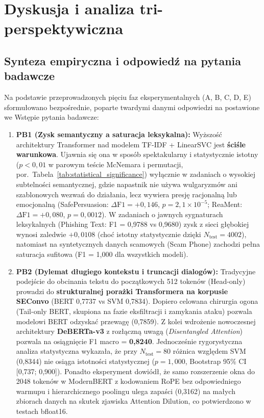 \documentclass[12pt,a4paper,twoside]{report}
\begin{document}
\chapter{Dyskusja i analiza tri-perspektywiczna}\label{ch:discussion}

\section{Synteza empiryczna i odpowiedź na pytania badawcze}
Na podstawie przeprowadzonych pięciu faz eksperymentalnych (A, B, C, D, E) sformułowano bezpośrednie, poparte twardymi danymi odpowiedzi na postawione we Wstępie pytania badawcze:

\begin{enumerate}[leftmargin=1.5em]
  \item \textbf{PB1 (Zysk semantyczny a saturacja leksykalna):} Wyższość architektury Transformer nad modelem TF-IDF + LinearSVC jest \textbf{ściśle warunkowa}. Ujawnia się ona w sposób spektakularny i statystycznie istotny ($p < 0,01$ w parowym teście McNemara i permutacji, por.~Tabela~\ref{tab:statistical_significance}) wyłącznie w zadaniach o wysokiej subtelności semantycznej, gdzie napastnik nie używa wulgaryzmów ani szablonowych wezwań do działania, lecz wywiera presję racjonalną lub emocjonalną (SafePersuasion: $\Delta\text{F1} = +0,146$, $p = 2,1 \times 10^{-5}$; ReaMent: $\Delta\text{F1} = +0,080$, $p = 0,0012$). W zadaniach o jawnych sygnaturach leksykalnych (Phishing Text: F1 = 0,9788 vs 0,9680) zysk z sieci głębokiej wynosi zaledwie $+0,0108$ (choć istotny statystycznie dzięki $N_{\text{test}}=4002$), natomiast na syntetycznych danych scamowych (Scam Phone) zachodzi pełna saturacja sufitowa (F1 = 1,000 dla wszystkich modeli).
  
  \item \textbf{PB2 (Dylemat długiego kontekstu i truncacji dialogów):} Tradycyjne podejście do obcinania tekstu do początkowych 512 tokenów (Head-only) prowadzi do \textbf{strukturalnej porażki Transformera na korpusie SEConvo} (BERT 0,7737 vs SVM 0,7834). Dopiero celowana chirurgia ogona (Tail-only BERT, skupiona na fazie eksfiltracji i zamykania ataku) pozwala modelowi BERT odzyskać przewagę (0,7859). Z kolei wdrożenie nowoczesnej architektury \textbf{DeBERTa-v3} z rozłączną uwagą (\emph{Disentangled Attention}) pozwala na osiągnięcie F1 macro = \textbf{0,8240}. Jednocześnie rygorystyczna analiza statystyczna wykazała, że przy $N_{\text{test}}=80$ różnica względem SVM (0,8344) nie osiąga istotności statystycznej ($p = 1,000$, Bootstrap 95\% CI [0,737; 0,900]). Ponadto eksperyment dowiódł, że samo rozszerzenie okna do 2048 tokenów w ModernBERT z kodowaniem RoPE bez odpowiedniego warmupu i hierarchicznego poolingu ulega zapaści (0,3162) na małych zbiorach danych na skutek zjawiska Attention Dilution, co potwierdzono w testach bfloat16.


\end{enumerate}
\end{document}

